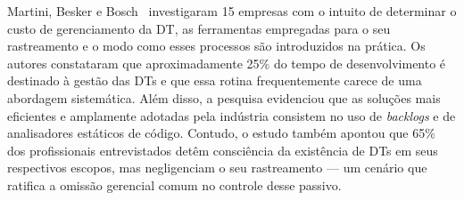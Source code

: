 Martini, Besker e Bosch~\cite{19} investigaram 15 empresas com o intuito de determinar o custo de gerenciamento da DT, as ferramentas empregadas para o seu rastreamento e o modo como esses processos são introduzidos na prática. Os autores constataram que aproximadamente 25\% do tempo de desenvolvimento é destinado à gestão das DTs e que essa rotina frequentemente carece de uma abordagem sistemática. Além disso, a pesquisa evidenciou que as soluções mais eficientes e amplamente adotadas pela indústria consistem no uso de \textit{backlogs} e de analisadores estáticos de código. Contudo, o estudo também apontou que 65\% dos profissionais entrevistados detêm consciência da existência de DTs em seus respectivos escopos, mas negligenciam o seu rastreamento — um cenário que ratifica a omissão gerencial comum no controle desse passivo.
